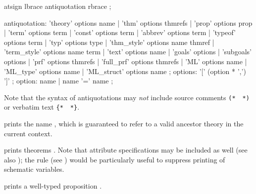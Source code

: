 \begin{isabellebody}
\begin{isamarkuptext}
  \begin{rail}
    atsign lbrace antiquotation rbrace
    ;

    antiquotation:
      'theory' options name |
      'thm' options thmrefs |
      'prop' options prop |
      'term' options term |
      'const' options term |
      'abbrev' options term |
      'typeof' options term |
      'typ' options type |
      'thm\_style' options name thmref |
      'term\_style' options name term |
      'text' options name |
      'goals' options |
      'subgoals' options |
      'prf' options thmrefs |
      'full\_prf' options thmrefs |
      'ML' options name |
      'ML\_type' options name |
      'ML\_struct' options name
    ;
    options: '[' (option * ',') ']'
    ;
    option: name | name '=' name
    ;
  \end{rail}

  Note that the syntax of antiquotations may \emph{not} include source
  comments \verb|(*|~\isa{{\isachardoublequote}{\isasymdots}{\isachardoublequote}}~\verb|*)| or verbatim
  text \verb|{|\verb|*|~\isa{{\isachardoublequote}{\isasymdots}{\isachardoublequote}}~\verb|*|\verb|}|.

  \begin{descr}
  
  \item [\isa{{\isachardoublequote}{\isacharat}{\isacharbraceleft}theory\ A{\isacharbraceright}{\isachardoublequote}}] prints the name , which is
  guaranteed to refer to a valid ancestor theory in the current
  context.

  \item [\isa{{\isachardoublequote}{\isacharat}{\isacharbraceleft}thm\ a\isactrlsub {\isadigit{1}}\ {\isasymdots}\ a\isactrlsub n{\isacharbraceright}{\isachardoublequote}}] prints theorems
  .  Note that attribute specifications
  may be included as well (see also ); the
  \hyperlink{attribute.no-vars}{\mbox{}} rule (see ) would
  be particularly useful to suppress printing of schematic variables.

  \item [\isa{{\isachardoublequote}{\isacharat}{\isacharbraceleft}prop\ {\isasymphi}{\isacharbraceright}{\isachardoublequote}}] prints a well-typed proposition \isa{{\isachardoublequote}{\isasymphi}{\isachardoublequote}}.


\end{descr}
\end{isamarkuptext}
\end{isabellebody}

